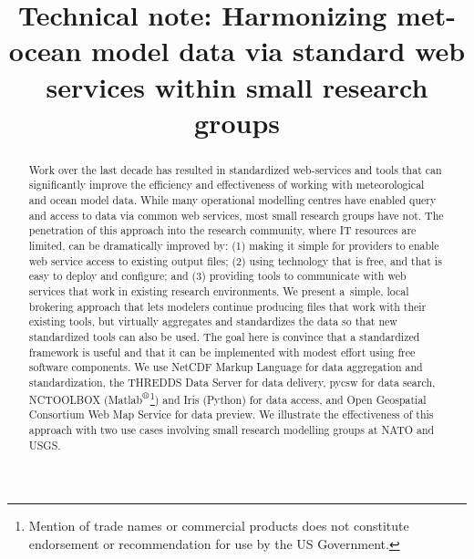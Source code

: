 \documentclass[osd, online, hvmath]{copernicus}
\begin{document}
\hack{\sloppy}

\title{Technical note: Harmonizing met-ocean model data via standard
  web services within small research groups}







\published{}



\maketitle


\begin{abstract}
  Work over the last decade has resulted in standardized web-services
  and tools that can significantly improve the efficiency and
  effectiveness of working with meteorological and ocean model
  data. While many operational modelling centres have enabled query and
  access to data via common web services, most small research groups
  have not. The penetration of this approach into the research
  community, where IT resources are limited, can be dramatically
  improved by: (1) making it simple for providers to enable web service
  access to existing output files; (2) using technology that
  is free, and that is easy to deploy and configure; and (3) providing
  tools to communicate with web services that work in existing
  research environments. We present
  a~simple, local brokering approach that lets modelers continue
  producing files that work with their existing tools, but virtually aggregates and standardizes the data so that new standardized tools can also be used. The goal here is convince that a standardized framework is useful and that it can be
implemented with modest effort using free software components. We use 
  NetCDF Markup Language for data aggregation and standardization, the THREDDS Data Server  for data delivery, pycsw for data search, NCTOOLBOX
  (Matlab$^{\text{\textregistered}}$\footnote{Mention of trade names
    or commercial products does not constitute endorsement or
    recommendation for use by the US Government.}) and Iris (Python)
  for data access, and Open Geospatial Consortium Web Map Service for
  data preview. We illustrate the effectiveness of this approach with
  two use cases involving small research modelling groups at NATO and
  USGS.
\end{abstract}
\end{document}
